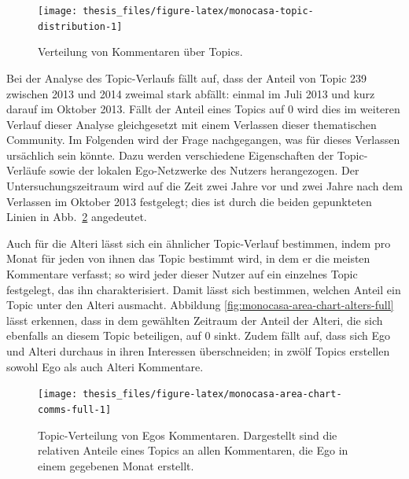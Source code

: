 \documentclass[11pt,a4paper,twoside]{article}
\begin{document}
\begin{figure}

{\centering \texttt{[image: thesis\_files/figure-latex/monocasa-topic-distribution-1]} 

}

\caption{Verteilung von Kommentaren über
Topics.}\label{fig:monocasa-topic-distribution}
\end{figure}

Bei der Analyse des Topic-Verlaufs fällt auf, dass der Anteil von Topic
239 zwischen 2013 und 2014 zweimal stark abfällt: einmal im Juli 2013
und kurz darauf im Oktober 2013. Fällt der Anteil eines Topics auf 0
wird dies im weiteren Verlauf dieser Analyse gleichgesetzt mit einem
Verlassen dieser thematischen Community. Im Folgenden wird der Frage
nachgegangen, was für dieses Verlassen ursächlich sein könnte. Dazu
werden verschiedene Eigenschaften der Topic-Verläufe sowie der lokalen
Ego-Netzwerke des Nutzers herangezogen. Der Untersuchungszeitraum wird
auf die Zeit zwei Jahre vor und zwei Jahre nach dem Verlassen im Oktober
2013 festgelegt; dies ist durch die beiden gepunkteten Linien in
Abb.~\ref{fig:monocasa-area-chart-comms-full} angedeutet.

Auch für die Alteri lässt sich ein ähnlicher Topic-Verlauf bestimmen,
indem pro Monat für jeden von ihnen das Topic bestimmt wird, in dem er
die meisten Kommentare verfasst; so wird jeder dieser Nutzer auf ein
einzelnes Topic festgelegt, das ihn charakterisiert. Damit lässt sich
bestimmen, welchen Anteil ein Topic unter den Alteri ausmacht. Abbildung
\ref{fig:monocasa-area-chart-alters-full} lässt erkennen, dass in dem
gewählten Zeitraum der Anteil der Alteri, die sich ebenfalls an diesem
Topic beteiligen, auf 0 sinkt. Zudem fällt auf, dass sich Ego und Alteri
durchaus in ihren Interessen überschneiden; in zwölf Topics erstellen
sowohl Ego als auch Alteri Kommentare.





\begin{figure}

{\centering \texttt{[image: thesis\_files/figure-latex/monocasa-area-chart-comms-full-1]} 

}

\caption{Topic-Verteilung von Egos
Kommentaren. Dargestellt sind die relativen Anteile eines Topics an
allen Kommentaren, die Ego in einem gegebenen Monat erstellt.}\label{fig:monocasa-area-chart-comms-full}
\end{figure}
\end{document}
